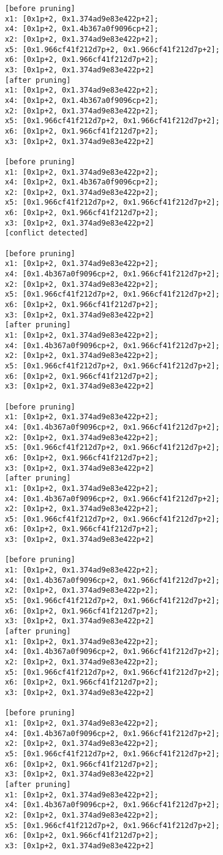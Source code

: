 \begin{lstlisting}
[before pruning]
x1: [0x1p+2, 0x1.374ad9e83e422p+2];
x4: [0x1p+2, 0x1.4b367a0f9096cp+2];
x2: [0x1p+2, 0x1.374ad9e83e422p+2];
x5: [0x1.966cf41f212d7p+2, 0x1.966cf41f212d7p+2];
x6: [0x1p+2, 0x1.966cf41f212d7p+2];
x3: [0x1p+2, 0x1.374ad9e83e422p+2]
[after pruning]
x1: [0x1p+2, 0x1.374ad9e83e422p+2];
x4: [0x1p+2, 0x1.4b367a0f9096cp+2];
x2: [0x1p+2, 0x1.374ad9e83e422p+2];
x5: [0x1.966cf41f212d7p+2, 0x1.966cf41f212d7p+2];
x6: [0x1p+2, 0x1.966cf41f212d7p+2];
x3: [0x1p+2, 0x1.374ad9e83e422p+2]

[before pruning]
x1: [0x1p+2, 0x1.374ad9e83e422p+2];
x4: [0x1p+2, 0x1.4b367a0f9096cp+2];
x2: [0x1p+2, 0x1.374ad9e83e422p+2];
x5: [0x1.966cf41f212d7p+2, 0x1.966cf41f212d7p+2];
x6: [0x1p+2, 0x1.966cf41f212d7p+2];
x3: [0x1p+2, 0x1.374ad9e83e422p+2]
[conflict detected]

[before pruning]
x1: [0x1p+2, 0x1.374ad9e83e422p+2];
x4: [0x1.4b367a0f9096cp+2, 0x1.966cf41f212d7p+2];
x2: [0x1p+2, 0x1.374ad9e83e422p+2];
x5: [0x1.966cf41f212d7p+2, 0x1.966cf41f212d7p+2];
x6: [0x1p+2, 0x1.966cf41f212d7p+2];
x3: [0x1p+2, 0x1.374ad9e83e422p+2]
[after pruning]
x1: [0x1p+2, 0x1.374ad9e83e422p+2];
x4: [0x1.4b367a0f9096cp+2, 0x1.966cf41f212d7p+2];
x2: [0x1p+2, 0x1.374ad9e83e422p+2];
x5: [0x1.966cf41f212d7p+2, 0x1.966cf41f212d7p+2];
x6: [0x1p+2, 0x1.966cf41f212d7p+2];
x3: [0x1p+2, 0x1.374ad9e83e422p+2]

[before pruning]
x1: [0x1p+2, 0x1.374ad9e83e422p+2];
x4: [0x1.4b367a0f9096cp+2, 0x1.966cf41f212d7p+2];
x2: [0x1p+2, 0x1.374ad9e83e422p+2];
x5: [0x1.966cf41f212d7p+2, 0x1.966cf41f212d7p+2];
x6: [0x1p+2, 0x1.966cf41f212d7p+2];
x3: [0x1p+2, 0x1.374ad9e83e422p+2]
[after pruning]
x1: [0x1p+2, 0x1.374ad9e83e422p+2];
x4: [0x1.4b367a0f9096cp+2, 0x1.966cf41f212d7p+2];
x2: [0x1p+2, 0x1.374ad9e83e422p+2];
x5: [0x1.966cf41f212d7p+2, 0x1.966cf41f212d7p+2];
x6: [0x1p+2, 0x1.966cf41f212d7p+2];
x3: [0x1p+2, 0x1.374ad9e83e422p+2]

[before pruning]
x1: [0x1p+2, 0x1.374ad9e83e422p+2];
x4: [0x1.4b367a0f9096cp+2, 0x1.966cf41f212d7p+2];
x2: [0x1p+2, 0x1.374ad9e83e422p+2];
x5: [0x1.966cf41f212d7p+2, 0x1.966cf41f212d7p+2];
x6: [0x1p+2, 0x1.966cf41f212d7p+2];
x3: [0x1p+2, 0x1.374ad9e83e422p+2]
[after pruning]
x1: [0x1p+2, 0x1.374ad9e83e422p+2];
x4: [0x1.4b367a0f9096cp+2, 0x1.966cf41f212d7p+2];
x2: [0x1p+2, 0x1.374ad9e83e422p+2];
x5: [0x1.966cf41f212d7p+2, 0x1.966cf41f212d7p+2];
x6: [0x1p+2, 0x1.966cf41f212d7p+2];
x3: [0x1p+2, 0x1.374ad9e83e422p+2]

[before pruning]
x1: [0x1p+2, 0x1.374ad9e83e422p+2];
x4: [0x1.4b367a0f9096cp+2, 0x1.966cf41f212d7p+2];
x2: [0x1p+2, 0x1.374ad9e83e422p+2];
x5: [0x1.966cf41f212d7p+2, 0x1.966cf41f212d7p+2];
x6: [0x1p+2, 0x1.966cf41f212d7p+2];
x3: [0x1p+2, 0x1.374ad9e83e422p+2]
[after pruning]
x1: [0x1p+2, 0x1.374ad9e83e422p+2];
x4: [0x1.4b367a0f9096cp+2, 0x1.966cf41f212d7p+2];
x2: [0x1p+2, 0x1.374ad9e83e422p+2];
x5: [0x1.966cf41f212d7p+2, 0x1.966cf41f212d7p+2];
x6: [0x1p+2, 0x1.966cf41f212d7p+2];
x3: [0x1p+2, 0x1.374ad9e83e422p+2]


\end{lstlisting}
